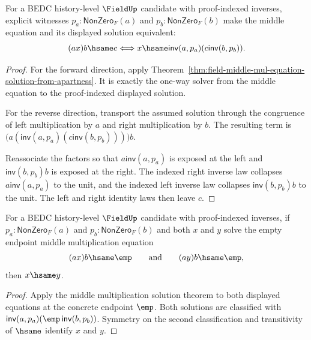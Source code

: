 \begin{theorem}
\label{thm:field-middle-mul-equation-exact-from-apartness}
For a BEDC history-level $\FieldUp$ candidate with proof-indexed inverses,
explicit witnesses $p_a:\mathsf{NonZero}_F(a)$ and
$p_b:\mathsf{NonZero}_F(b)$ make the middle equation and its displayed
solution equivalent:
$$
(a x)b\hsame c
\Longleftrightarrow
x\hsame \mathsf{inv}(a,p_a)(c\mathsf{inv}(b,p_b)).
$$
\end{theorem}
\begin{proof}
For the forward direction, apply
Theorem~\ref{thm:field-middle-mul-equation-solution-from-apartness}. It is
exactly the one-way solver from the middle equation to the proof-indexed
displayed solution.

For the reverse direction, transport the assumed solution through the
congruence of left multiplication by $a$ and right multiplication by $b$.
The resulting term is
$\bigl(a(\mathsf{inv}(a,p_a)(c\mathsf{inv}(b,p_b)))\bigr)b$.

Reassociate the factors so that $a\mathsf{inv}(a,p_a)$ is exposed at the
left and $\mathsf{inv}(b,p_b)b$ is exposed at the right. The indexed right
inverse law collapses $a\mathsf{inv}(a,p_a)$ to the unit, and the indexed
left inverse law collapses $\mathsf{inv}(b,p_b)b$ to the unit. The left and
right identity laws then leave $c$.
\end{proof}

\begin{theorem}
\label{thm:field-middle-mul-empty-equation-solution-unique-from-apartness}
For a BEDC history-level $\FieldUp$ candidate with proof-indexed inverses, if
$p_a:\mathsf{NonZero}_F(a)$ and $p_b:\mathsf{NonZero}_F(b)$ and both $x$ and
$y$ solve the empty endpoint middle multiplication equation
$$
(a x)b\hsame \emp
\qquad\text{and}\qquad
(a y)b\hsame \emp,
$$
then $x\hsame y$.
\end{theorem}
\begin{proof}
Apply the middle multiplication solution theorem to both displayed equations at
the concrete endpoint $\emp$. Both solutions are classified with
$\mathsf{inv}(a,p_a)(\emp\,\mathsf{inv}(b,p_b))$. Symmetry on the second
classification and transitivity of $\hsame$ identify $x$ and $y$.
\end{proof}
